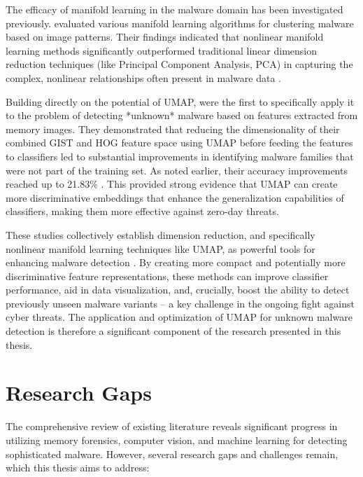 The efficacy of manifold learning in the malware domain has been investigated previously. \citet{sharma2018efficacy} evaluated various manifold learning algorithms for clustering malware based on image patterns. Their findings indicated that nonlinear manifold learning methods significantly outperformed traditional linear dimension reduction techniques (like Principal Component Analysis, PCA) in capturing the complex, nonlinear relationships often present in malware data \citep{sharma2018efficacy}.

Building directly on the potential of UMAP, \citet{bozkir2021catch} were the first to specifically apply it to the problem of detecting *unknown* malware based on features extracted from memory images. They demonstrated that reducing the dimensionality of their combined GIST and HOG feature space using UMAP before feeding the features to classifiers led to substantial improvements in identifying malware families that were not part of the training set. As noted earlier, their accuracy improvements reached up to 21.83\% \citep{bozkir2021catch}. This provided strong evidence that UMAP can create more discriminative embeddings that enhance the generalization capabilities of classifiers, making them more effective against zero-day threats.

These studies collectively establish dimension reduction, and specifically nonlinear manifold learning techniques like UMAP, as powerful tools for enhancing malware detection \citep{bozkir2021catch}. By creating more compact and potentially more discriminative feature representations, these methods can improve classifier performance, aid in data visualization, and, crucially, boost the ability to detect previously unseen malware variants – a key challenge in the ongoing fight against cyber threats. The application and optimization of UMAP for unknown malware detection is therefore a significant component of the research presented in this thesis.

\section{Research Gaps}
\label{sec:research_gaps}

The comprehensive review of existing literature reveals significant progress in utilizing memory forensics, computer vision, and machine learning for detecting sophisticated malware. However, several research gaps and challenges remain, which this thesis aims to address:

